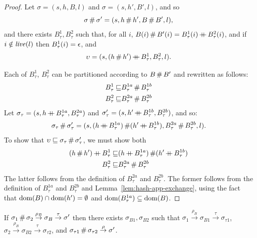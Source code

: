 \documentclass[11pt]{article}
\begin{document}
\begin{proof}
	Let $\sigma = (s,h,B,l)$ and $\sigma = (s,h',B',l)$, and so \[\sigma \operatorname{\#} \sigma' = (s,h \operatorname{\#} h',B \operatorname{\#} B',l),\] and there exists $B_\tau^1,B_\tau^2$ such that, for all $i$, $B(i) \operatorname{\#} B'(i) = B_\tau^1(i) \operatorname{+\!\!\!+} B_\tau^2(i)$, and if $i \notin \mathit{live}(l)$ then $B_\tau^1(i) = \epsilon$, and \begin{align*}
		\upsilon = (s,(h \operatorname{\#} h') \operatorname{+\!\!\!+} B_\tau^1, B_\tau^2,l).
	\end{align*}

	Each of $B_\tau^1$, $B_\tau^2$ can be partitioned according to $B \operatorname{\#} B'$ and rewritten as follows: \begin{align*}
		B_\tau^1 \sqsubseteq & B_\tau^{1a} \operatorname{\#} B_\tau^{1b} \\
		B_\tau^2 \sqsubseteq & B_\tau^{2a} \operatorname{\#} B_\tau^{2b}
	\end{align*} Let $\sigma_\tau = (s,h \operatorname{+\!\!\!+} B_\tau^{1a}, B_\tau^{2a})$ and $\sigma'_\tau = (s,h' \operatorname{+\!\!\!+} B_\tau^{1b}, B_\tau^{2b})$, and so: \begin{align*} \sigma_\tau \operatorname{\#} \sigma'_\tau = (s, (h \operatorname{+\!\!\!+} B_\tau^{1a}) \operatorname{\#} (h' \operatorname{+\!\!\!+} B_\tau^{1b}), B_\tau^{2a} \operatorname{\#} B_\tau^{2b},l).
	\end{align*} To show that $\upsilon \sqsubseteq \sigma_\tau \operatorname{\#} \sigma'_\tau$, we must show both \begin{align*} (h \fhash h') \lapp B_\tau^1 \refines&  (h \lapp B_\tau^{1a}) \fhash (h' \lapp B_\tau^{1b}) \\ B_\tau^2 \refines&  B_\tau^{2a} \fhash B_\tau^{2b} \end{align*} The latter follows from the definition of $B_\tau^{2a}$ and $B_\tau^{2b}$. The former follows from the definition of $B_\tau^{1a}$ and $B_\tau^{2b}$ and Lemma~\ref{lem:hash-app-exchange}, using the fact that $\operatorname{\mathrm{dom}}(B) \cap \operatorname{\mathrm{dom}}(h') = \operatorname{\emptyset}$ and $\operatorname{\mathrm{dom}}(B_\tau^{1a}) \subseteq \operatorname{\mathrm{dom}}(B)$. 
\end{proof}

\begin{lemma}
	\label{lem:separation-rho-buffer}
	If $\sigma_1 \operatorname{\#} \sigma_2 \stackrel{\rho_B}{\rightarrow} \sigma_B \stackrel{\tau}{\rightarrow} \sigma'$ then there exists $\sigma_{B1},\sigma_{B2}$ such that $\sigma_{1} \stackrel{\rho_B}{\rightarrow} \sigma_{B1} \stackrel{\tau}{\rightarrow} \sigma_{\tau1}$, $\sigma_{2} \stackrel{\rho_B}{\rightarrow} \sigma_{B2} \stackrel{\tau}{\rightarrow} \sigma_{\tau2}$, and $\sigma_{\tau1} \operatorname{\#} \sigma_{\tau2} \stackrel{\rho}{\rightarrow} \sigma'$. 
\end{lemma}
\end{document}
